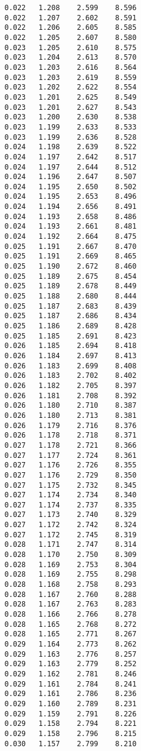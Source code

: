 \begin{verbatim}
   0.022   1.208    2.599    8.596
   0.022   1.207    2.602    8.591
   0.022   1.206    2.605    8.585
   0.022   1.205    2.607    8.580
   0.023   1.205    2.610    8.575
   0.023   1.204    2.613    8.570
   0.023   1.203    2.616    8.564
   0.023   1.203    2.619    8.559
   0.023   1.202    2.622    8.554
   0.023   1.201    2.625    8.549
   0.023   1.201    2.627    8.543
   0.023   1.200    2.630    8.538
   0.023   1.199    2.633    8.533
   0.023   1.199    2.636    8.528
   0.024   1.198    2.639    8.522
   0.024   1.197    2.642    8.517
   0.024   1.197    2.644    8.512
   0.024   1.196    2.647    8.507
   0.024   1.195    2.650    8.502
   0.024   1.195    2.653    8.496
   0.024   1.194    2.656    8.491
   0.024   1.193    2.658    8.486
   0.024   1.193    2.661    8.481
   0.024   1.192    2.664    8.475
   0.025   1.191    2.667    8.470
   0.025   1.191    2.669    8.465
   0.025   1.190    2.672    8.460
   0.025   1.189    2.675    8.454
   0.025   1.189    2.678    8.449
   0.025   1.188    2.680    8.444
   0.025   1.187    2.683    8.439
   0.025   1.187    2.686    8.434
   0.025   1.186    2.689    8.428
   0.025   1.185    2.691    8.423
   0.026   1.185    2.694    8.418
   0.026   1.184    2.697    8.413
   0.026   1.183    2.699    8.408
   0.026   1.183    2.702    8.402
   0.026   1.182    2.705    8.397
   0.026   1.181    2.708    8.392
   0.026   1.180    2.710    8.387
   0.026   1.180    2.713    8.381
   0.026   1.179    2.716    8.376
   0.026   1.178    2.718    8.371
   0.027   1.178    2.721    8.366
   0.027   1.177    2.724    8.361
   0.027   1.176    2.726    8.355
   0.027   1.176    2.729    8.350
   0.027   1.175    2.732    8.345
   0.027   1.174    2.734    8.340
   0.027   1.174    2.737    8.335
   0.027   1.173    2.740    8.329
   0.027   1.172    2.742    8.324
   0.027   1.172    2.745    8.319
   0.028   1.171    2.747    8.314
   0.028   1.170    2.750    8.309
   0.028   1.169    2.753    8.304
   0.028   1.169    2.755    8.298
   0.028   1.168    2.758    8.293
   0.028   1.167    2.760    8.288
   0.028   1.167    2.763    8.283
   0.028   1.166    2.766    8.278
   0.028   1.165    2.768    8.272
   0.028   1.165    2.771    8.267
   0.029   1.164    2.773    8.262
   0.029   1.163    2.776    8.257
   0.029   1.163    2.779    8.252
   0.029   1.162    2.781    8.246
   0.029   1.161    2.784    8.241
   0.029   1.161    2.786    8.236
   0.029   1.160    2.789    8.231
   0.029   1.159    2.791    8.226
   0.029   1.158    2.794    8.221
   0.029   1.158    2.796    8.215
   0.030   1.157    2.799    8.210

\end{verbatim}
